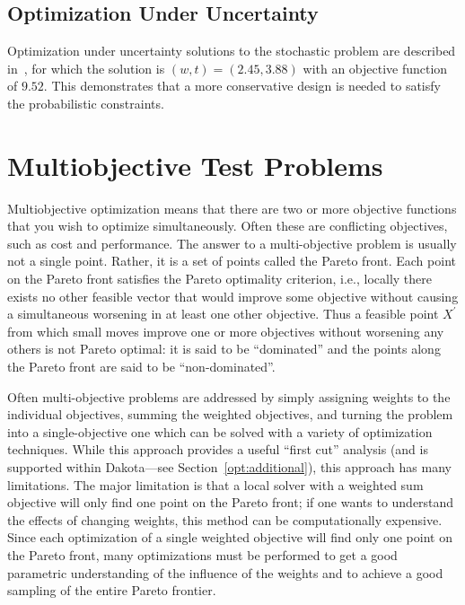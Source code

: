 \subsection{Optimization Under Uncertainty}
Optimization under uncertainty solutions to the
stochastic problem are described in~\cite{Eld02,Eld05,Eld06a}, for
which the solution is $(w,t)=(2.45,3.88)$ with an objective function
of $9.52$. This demonstrates that a more conservative design is
needed to satisfy the probabilistic constraints.

\section{Multiobjective Test Problems}\label{additional:multiobjective}

Multiobjective optimization means that there are two or more
objective functions that you wish to optimize simultaneously. Often
these are conflicting objectives, such as cost and performance. The
answer to a multi-objective problem is usually not a single point.
Rather, it is a set of points called the Pareto front. Each point
on the Pareto front satisfies the Pareto optimality criterion, i.e.,
locally there exists no other feasible vector that would improve some
objective without causing a simultaneous worsening in at least one
other objective. Thus a feasible point $X^\prime$ from which
small moves improve one or more objectives without worsening
any others is not Pareto optimal: it is said to be ``dominated''
and the points along the Pareto front are said to be
``non-dominated''.

Often multi-objective problems are addressed by simply assigning
weights to the individual objectives, summing the weighted
objectives, and turning the problem into a single-objective one
which can be solved with a variety of optimization techniques. While
this approach provides a useful ``first cut'' analysis (and is
supported within Dakota---see Section~\ref{opt:additional}), this
approach has many limitations. The major limitation is that a
local solver with a weighted sum objective will only find one
point on the Pareto front; if one wants to understand
the effects of changing weights, this method can be computationally
expensive. Since each optimization of a single weighted objective
will find only one point on the Pareto front, many
optimizations must be performed to get a good parametric
understanding of the influence of the weights and to achieve a good
sampling of the entire Pareto frontier.

